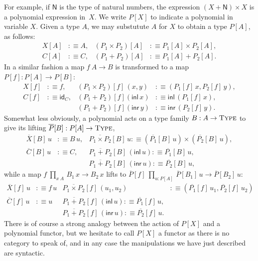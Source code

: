 \documentclass[a4paper,UKenglish]{lipics-v2016}
\newcommand{\tyFont}[1]{\textsf{#1}} %
\newcommand{\termFont}[1]{\textsf{#1}} %
\newcommand{\nat}{\tyFont{N}} %
\newcommand{\lift}[1]{\overline{#1}} %
\newcommand{\defeq}{\mathrel{{:}{\equiv}}} %
\newcommand{\idmap}[1]{\termFont{id}_{#1}} %
\newcommand{\inl}[1]{\termFont{inl}\,#1} %
\newcommand{\inr}[1]{\termFont{inr}\,#1} %
\newcommand{\dprod}[1]{{\textstyle\prod_{#1}}\,} %
\newcommand{\Type}[0]{\operatorname{\textsc{Type}}}
\begin{document}
For example, if $\nat$ is the type of natural numbers, the expression
$(X + \nat) \times X$ is a polynomial expression in~$X$. We write $P[X]$ to indicate a
polynomial in variable $X$. Given a type $A$, we may substutute $A$ for $X$ to obtain a
type $P[A]$, as follows:
%
\begin{align*}
  X[A] &\defeq A, &
  (P_1 \times P_2)[A] &\defeq P_1[A] \times P_2[A], \\
  C[A] &\defeq C, &
  (P_1 + P_2)[A] &\defeq P_1[A] + P_2[A].
\end{align*}
%
In a similar fashion a map $f \> A \to B$ is transformed to a map $P[f] : P[A] \to P[B]$:
%
\begin{align*}
  X[f] &\defeq f, &
  (P_1 \times P_2)[f] \, (x,y) &\defeq (P_1[f]\, x, P_2[f] \, y), \\
  C[f] &\defeq \idmap{C}, &
  (P_1 + P_2)[f](\inl{x}) &\defeq \inl{(P_1[f]\,x)}, \\
  & &
  (P_1 + P_2)[f](\inr{y}) &\defeq \inr{(P_2[f]\,y)}.
\end{align*}
%
Somewhat less obviously, a polynomial acts on a type family $B : A \to \Type$ to
give its lifting $\lift{P}[B] : P[A] \to \Type$,
%
\begin{align*}
  \lift{X}[B] \, u &\defeq B\,u, &
  \lift{P_1 \times P_2}[B] \, u \defeq (\lift{P_1}[B]\,u) \times (\lift{P_2}[B]\,u), \\
  \lift{C}[B] \, u &\defeq C, &
  \lift{P_1 + P_2}[B] \, (\inl{u})\defeq \lift{P_1}[B]\,u, \\
  & &
  \lift{P_1 + P_2}[B] \, (\inr{u})\defeq \lift{P_2}[B]\,u,
\end{align*}
%
while a map $f \> \dprod{x \> A} B_1\,x \to B_2\,x$ lifts to
$\lift{P}[f] \> \dprod{u : P[A]} \lift{P}[B_1]\,u \to \lift{P}[B_2]\,u$:
%
\begin{align*}
  \lift{X}[f] \, u &\defeq f \, u &
  \lift{P_1 \times P_2}[f] \, (u_1, u_2) &\defeq (\lift{P_1}[f]\,u_1, \lift{P_2}[f]\,u_2) \\
  \lift{C}[f] \, u &\defeq u &
  \lift{P_1 + P_2}[f] \, (\inl{u})\defeq \lift{P_1}[f]\,u, \\
  & &
  \lift{P_1 + P_2}[f] \, (\inr{u})\defeq \lift{P_2}[f]\,u.
\end{align*}
%
There is of course a strong analogy between the action of $P[X]$ and a polynomial functor,
but we hesitate to call $P[X]$ a functor as there is no category to speak of, and in any
case the manipulations we have just described are syntactic.
\end{document}
